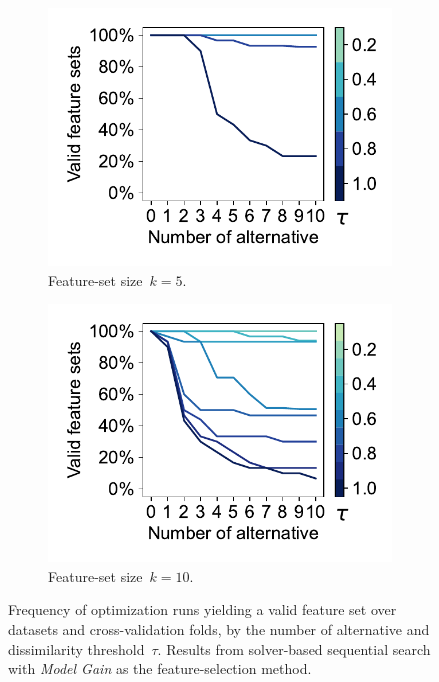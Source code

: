\documentclass{article}
\theoremstyle{definition}
\begin{document}
\begin{figure}[t]
	\centering
	\begin{subfigure}[t]{0.48\textwidth}
		\centering
		\includegraphics[width=\textwidth, trim=15 15 10 15, clip]{plots/afs-impact-num-alternatives-tau-optimization-status-k-5.pdf}
		\caption{Feature-set size~$k=5$.}
		\label{fig:afs:impact-num-alternatives-tau-optimization-status-k-5}
	\end{subfigure}
	\hfill
	\begin{subfigure}[t]{0.48\textwidth}
		\centering
		\includegraphics[width=\textwidth, trim=15 15 10 15, clip]{plots/afs-impact-num-alternatives-tau-optimization-status-k-10.pdf}
		\caption{Feature-set size~$k=10$.}
		\label{fig:afs:impact-num-alternatives-tau-optimization-status-k-10}
	\end{subfigure}
	\caption{
		Frequency of optimization runs yielding a valid feature set over datasets and cross-validation folds, by the number of alternative and dissimilarity threshold~$\tau$.
		Results from solver-based sequential search with \emph{Model Gain} as the feature-selection method.
	}
	\label{fig:afs:impact-num-alternatives-tau-optimization-status}
\end{figure}
\end{document}
